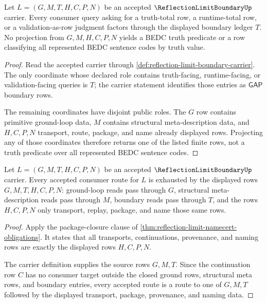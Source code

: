 \begin{theorem}
\label{thm:reflection-limit-truth-boundary-nonescape}
Let $L=(G,M,T,H,C,P,N)$ be an accepted $\ReflectionLimitBoundaryUp$ carrier. Every consumer query asking for a truth-total row, a runtime-total row, or a validation-as-row judgment factors through the displayed boundary ledger $T$. No projection from $G,M,H,C,P,N$ yields a BEDC truth predicate or a row classifying all represented BEDC sentence codes by truth value.
\end{theorem}
\begin{proof}
Read the accepted carrier through \autoref{def:reflection-limit-boundary-carrier}. The only coordinate whose declared role contains truth-facing, runtime-facing, or validation-facing queries is $T$; the carrier statement identifies those entries as $\mathsf{GAP}$ boundary rows.

The remaining coordinates have disjoint public roles. The $G$ row contains primitive ground-loop data, $M$ contains structural meta-description data, and $H,C,P,N$ transport, route, package, and name already displayed rows. Projecting any of those coordinates therefore returns one of the listed finite rows, not a truth predicate over all represented BEDC sentence codes.
\end{proof}

\begin{theorem}
\label{thm:reflection-limit-package-route-closure}
Let $L=(G,M,T,H,C,P,N)$ be an accepted $\ReflectionLimitBoundaryUp$ carrier. Every accepted consumer route for $L$ is exhausted by the displayed rows $G,M,T,H,C,P,N$: ground-loop reads pass through $G$, structural meta-description reads pass through $M$, boundary reads pass through $T$, and the rows $H,C,P,N$ only transport, replay, package, and name those same rows.
\end{theorem}
\begin{proof}
Apply the package-closure clause of \autoref{thm:reflection-limit-namecert-obligations}. It states that all transports, continuations, provenance, and naming rows are exactly the displayed rows $H,C,P,N$.

The carrier definition supplies the source rows $G,M,T$. Since the continuation row $C$ has no consumer target outside the closed ground rows, structural meta rows, and boundary entries, every accepted route is a route to one of $G,M,T$ followed by the displayed transport, package, provenance, and naming data.
\end{proof}

